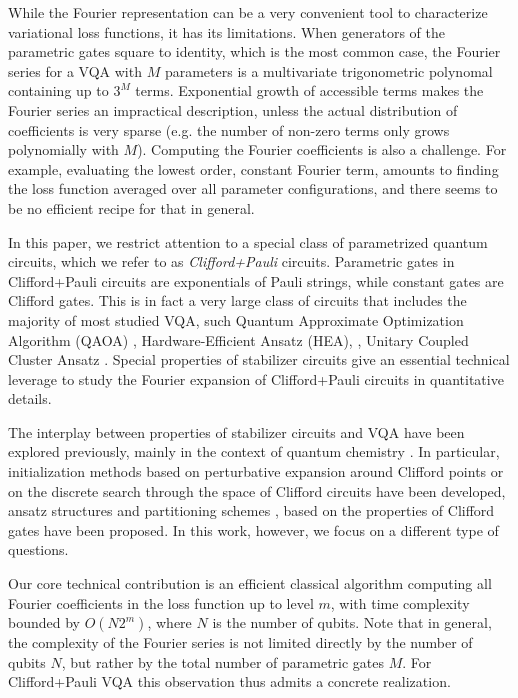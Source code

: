 \documentclass[twocolumn, amsfonts, amssymb, aps, nofootinbib]{revtex4-2}
\newcommand{\CP}{Clifford+Pauli}
\begin{document}
While the Fourier representation can be a very convenient tool to characterize variational loss functions, it has its limitations. When generators of the parametric gates square to identity, which is the most common case, the Fourier series for a VQA with $M$ parameters is a multivariate trigonometric polynomal containing up to $3^M$ terms. Exponential growth of accessible terms makes the Fourier series an impractical description, unless the actual distribution of coefficients is very sparse (e.g. the number of non-zero terms only grows polynomially with $M$). Computing the Fourier coefficients is also a challenge. For example, evaluating the lowest order, constant Fourier term, amounts to finding the loss function averaged over all parameter configurations, and there seems to be no efficient recipe for that in general.  

In this paper, we restrict attention to a special class of parametrized quantum circuits, which we refer to as \textit{\CP{}} circuits. Parametric gates in \CP{} circuits are exponentials of Pauli strings, while constant gates are Clifford gates. This is in fact a very large class of circuits that includes the majority of most studied VQA, such Quantum Approximate Optimization Algorithm (QAOA) \cite{Farhi2014}, Hardware-Efficient Ansatz (HEA), \cite{Kandala2017}, Unitary Coupled Cluster Ansatz \cite{Romero2018}. Special properties of stabilizer circuits \cite{Gottesman1997, Aaronson2004} give an essential technical leverage to study the Fourier expansion of \CP{} circuits in quantitative details. 

The interplay between properties of stabilizer circuits and VQA have been explored previously, mainly in the context of quantum chemistry \cite{Cao2019, Bauer2020}. In particular, initialization methods based on perturbative expansion around Clifford points \cite{Mitarai2022} or on the discrete search through the space of Clifford circuits \cite{Cheng2022, Ravi2022} have been developed, ansatz structures \cite{Ryabinkin2020, Brown2022a} and partitioning schemes \cite{Schleich2023}, based on the properties of Clifford gates have been proposed. In this work, however, we focus on a different type of questions.

Our core technical contribution is an efficient classical algorithm computing all Fourier coefficients in the loss function up to level $m$, with time complexity bounded by $O(N2^m)$, where $N$ is the number of qubits. Note that in general, the complexity of the Fourier series is not limited directly by the number of qubits $N$, but rather by the total number of parametric gates $M$. For \CP{} VQA this observation thus admits a concrete realization.
\end{document}
